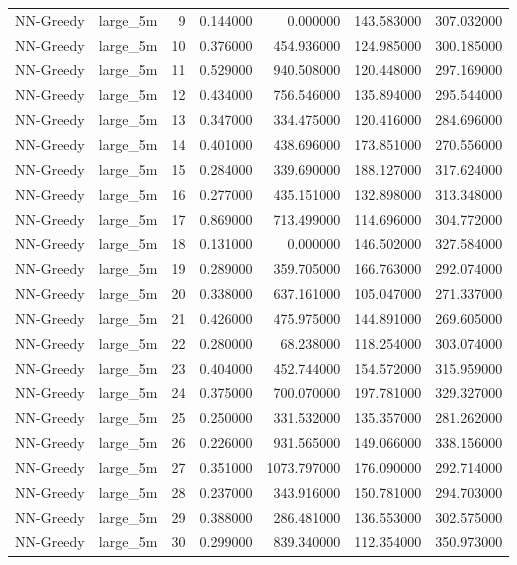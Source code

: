 \begin{tabular}{llrrrrr}
NN-Greedy & large_5m & 9 & 0.144000 & 0.000000 & 143.583000 & 307.032000 \\
NN-Greedy & large_5m & 10 & 0.376000 & 454.936000 & 124.985000 & 300.185000 \\
NN-Greedy & large_5m & 11 & 0.529000 & 940.508000 & 120.448000 & 297.169000 \\
NN-Greedy & large_5m & 12 & 0.434000 & 756.546000 & 135.894000 & 295.544000 \\
NN-Greedy & large_5m & 13 & 0.347000 & 334.475000 & 120.416000 & 284.696000 \\
NN-Greedy & large_5m & 14 & 0.401000 & 438.696000 & 173.851000 & 270.556000 \\
NN-Greedy & large_5m & 15 & 0.284000 & 339.690000 & 188.127000 & 317.624000 \\
NN-Greedy & large_5m & 16 & 0.277000 & 435.151000 & 132.898000 & 313.348000 \\
NN-Greedy & large_5m & 17 & 0.869000 & 713.499000 & 114.696000 & 304.772000 \\
NN-Greedy & large_5m & 18 & 0.131000 & 0.000000 & 146.502000 & 327.584000 \\
NN-Greedy & large_5m & 19 & 0.289000 & 359.705000 & 166.763000 & 292.074000 \\
NN-Greedy & large_5m & 20 & 0.338000 & 637.161000 & 105.047000 & 271.337000 \\
NN-Greedy & large_5m & 21 & 0.426000 & 475.975000 & 144.891000 & 269.605000 \\
NN-Greedy & large_5m & 22 & 0.280000 & 68.238000 & 118.254000 & 303.074000 \\
NN-Greedy & large_5m & 23 & 0.404000 & 452.744000 & 154.572000 & 315.959000 \\
NN-Greedy & large_5m & 24 & 0.375000 & 700.070000 & 197.781000 & 329.327000 \\
NN-Greedy & large_5m & 25 & 0.250000 & 331.532000 & 135.357000 & 281.262000 \\
NN-Greedy & large_5m & 26 & 0.226000 & 931.565000 & 149.066000 & 338.156000 \\
NN-Greedy & large_5m & 27 & 0.351000 & 1073.797000 & 176.090000 & 292.714000 \\
NN-Greedy & large_5m & 28 & 0.237000 & 343.916000 & 150.781000 & 294.703000 \\
NN-Greedy & large_5m & 29 & 0.388000 & 286.481000 & 136.553000 & 302.575000 \\
NN-Greedy & large_5m & 30 & 0.299000 & 839.340000 & 112.354000 & 350.973000 \\

\end{tabular}
